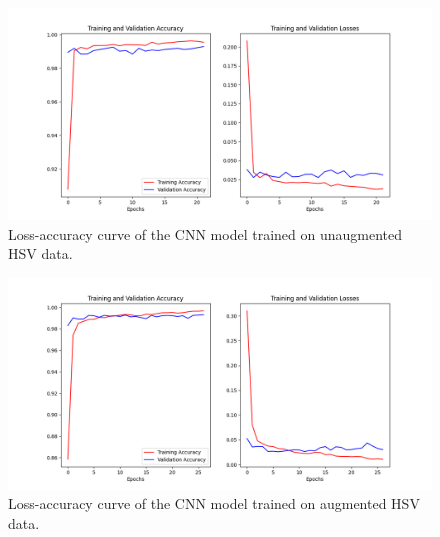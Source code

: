\documentclass[10pt,twocolumn,letterpaper]{article}
\begin{document}
\begin{figure}[t]
   \begin{center}
      \includegraphics[width=1\linewidth]{../Plots/loss-curves/CNN_unaug_losscurve_HSV.png}
   \end{center}
      \caption{Loss-accuracy curve of the CNN model trained on unaugmented HSV data.}
   \label{fig:cnn_hsv_losscurve}
\end{figure}


\begin{figure}[t]
   \begin{center}
      \includegraphics[width=1\linewidth]{../Plots/loss-curves/CNN_aug_losscurve_HSV.png}
   \end{center}
      \caption{Loss-accuracy curve of the CNN model trained on augmented HSV data.}
   \label{fig:cnn_hsv_aug_losscurve}
\end{figure}
\end{document}

